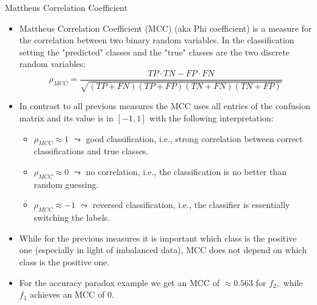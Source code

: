 \begin{vbframe}{Mattheus Correlation Coefficient}
	\footnotesize{
	\begin{itemize}
		\item Mattheus Correlation Coefficient (MCC) (aka Phi coefficient) is a measure for the correlation between two binary random variables. In the classification setting the "predicted" classes and the "true" classes are the two discrete random variables:
%		
		$$   \rho_{MCC} = \frac{TP\cdot TN - FP \cdot FN}{\sqrt{(TP+FN)(TP+FP)(TN+FN)(TN+FP)}}$$
%		
		 \item In contrast to all previous measures the MCC uses all entries of the confusion matrix and its value is in $[-1,1]$ with the following interpretation:
%		 
		\begin{itemize}
			\footnotesize
			\item $\rho_{MCC} \approx 1$ $\leadsto$ good classification, i.e., strong correlation between correct classifications and true classes.
			\item $\rho_{MCC} \approx 0$ $\leadsto$ no correlation, i.e., the classification is no better than random guessing.
			\item $\rho_{MCC} \approx -1$ $\leadsto$ reversed classification, i.e., the classifier is essentially switching the labels.
		\end{itemize}
	 \item While for the previous measures it is important which class is the positive one (especially in light of imbalanced data), MCC does not depend on which class is the positive one.
%		
	\item For the accuracy paradox example we get an MCC of $\approx 0.563$ for $f_2,$ while $f_1$ achieves an MCC of 0. 
\end{itemize}
	}
\end{vbframe}


